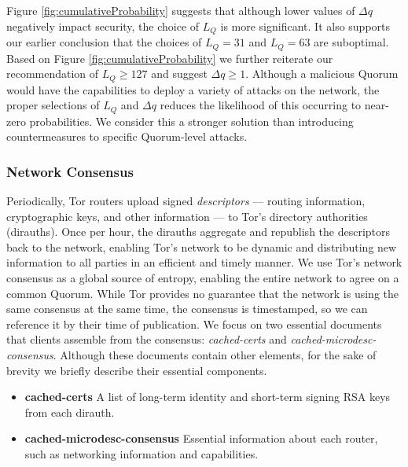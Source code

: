 \documentclass{sig-alternate}
\begin{document}
Figure \ref{fig:cumulativeProbability} suggests that although lower values of $ \Delta q $ negatively impact security, the choice of $ L_{Q} $ is more significant. It also supports our earlier conclusion that the choices of $ L_{Q} = 31 $ and $ L_{Q} = 63 $ are suboptimal. Based on Figure \ref{fig:cumulativeProbability} we further reiterate our recommendation of $ L_{Q} \geq 127 $ and suggest $ \Delta q \geq 1 $. Although a malicious Quorum would have the capabilities to deploy a variety of attacks on the network, the proper selections of $ L_{Q} $ and $ \Delta q $ reduces the likelihood of this occurring to near-zero probabilities. We consider this a stronger solution than introducing countermeasures to specific Quorum-level attacks.

\subsubsection{Network Consensus}


Periodically, Tor routers upload signed \emph{descriptors} --- routing information, cryptographic keys, and other information --- to Tor's directory authorities (dirauths). Once per hour, the dirauths aggregate and republish the descriptors back to the network, enabling Tor's network to be dynamic and distributing new information to all parties in an efficient and timely manner. We use Tor's network consensus as a global source of entropy, enabling the entire network to agree on a common Quorum. While Tor provides no guarantee that the network is using the same consensus at the same time, the consensus is timestamped, so we can reference it by their time of publication. We focus on two essential documents that clients assemble from the consensus: \emph{cached-certs} and \emph{cached-microdesc-consensus}. Although these documents contain other elements, for the sake of brevity we briefly describe their essential components.

\begin{itemize}[noitemsep,nolistsep]
	\item \textbf{cached-certs} A list of long-term identity and short-term signing RSA keys from each dirauth.
	\item \textbf{cached-microdesc-consensus} Essential information about each router, such as networking information and capabilities.
\end{itemize}
\end{document}
